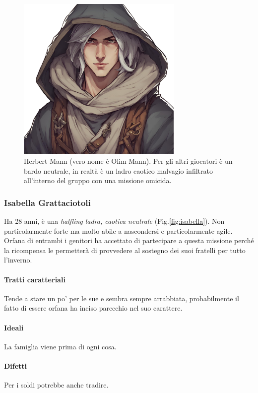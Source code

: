 \documentclass[letterpaper,twocolumn,openany,nodeprecatedcode]{dndbook}
\begin{document}
\begin{figure}
\centering
\includegraphics[width=8cm]{img/herbert-mann.png}
    \caption{\textsf{Herbert Mann (vero nome è Olim Mann). Per gli altri giocatori è un bardo neutrale, in realtà è un ladro caotico malvagio infiltrato all'interno del gruppo con una missione omicida.}\cite{url:ai}}
    \label{fig:herbert}
\end{figure}


\subsubsection{Isabella Grattaciotoli}
Ha 28 anni, è una \textit{halfling ladra, caotica neutrale} (Fig.\ref{fig:isabella}). Non particolarmente forte ma molto abile a nascondersi e particolarmente agile. Orfana di entrambi i genitori ha accettato di partecipare a questa missione perché la ricompensa le permetterà di provvedere al sostegno dei suoi fratelli per tutto l'inverno.
\paragraph{Tratti caratteriali} Tende a stare un po' per le sue e sembra sempre arrabbiata, probabilmente il fatto di essere orfana ha inciso parecchio nel suo carattere.
\paragraph{Ideali} La famiglia viene prima di ogni cosa.
\paragraph{Difetti} Per i soldi potrebbe anche tradire.
\end{document}
